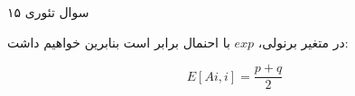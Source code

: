 سوال تئوری ۱۵

در متغیر برنولی، 
$exp$
با احنمال برابر است بنابرین خواهیم داشت:

$$ 
E[A{i, i}] =\frac{p + q}{2}
$$